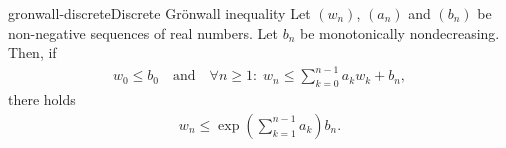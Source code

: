 \begin{Lemma*}{gronwall-discrete}{Discrete Grönwall inequality}
   Let $(w_n)$, $(a_n)$ and $(b_n)$ be
  non-negative sequences of real numbers. Let $b_n$ be monotonically
  nondecreasing. Then, if
  \begin{gather}
    \label{eq:gronwall-discrete:1}
    w_0 \le b_0
    \quad\text{and}\quad
    \forall n\ge 1 :\;
    w_n \le \sum\limits_{k=0}^{n-1} a_k w_k + b_n,
  \end{gather}
  there holds
  \begin{gather}
    \label{eq:explicit:5}
    w_n \le \exp \left(\sum\limits_{k=1}^{n-1} a_k\right) b_n.
  \end{gather}
\end{Lemma*}

